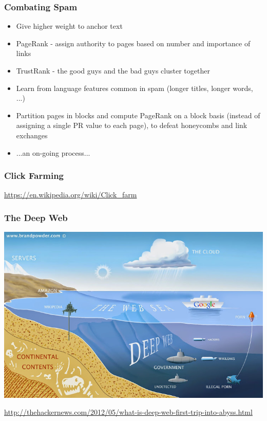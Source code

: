 \documentclass{beamer}
\begin{document}
\begin{frame}   \frametitle{Combating Spam}

\begin{itemize}
\item Give higher weight to anchor text
\item PageRank - assign authority to pages based on number and importance of links
\item TrustRank - the good guys and the bad guys cluster together
\item Learn from language features common in spam (longer titles,
  longer words, ...)
\item Partition pages in blocks and compute PageRank on a block basis
  (instead of assigning a single PR value to each page), to defeat
  honeycombs and link exchanges
\item ...an on-going process... 

\end{itemize}
\end{frame}



\begin{frame} \frametitle{Click Farming}

\href{https://en.wikipedia.org/wiki/Click_farm}{\url{https://en.wikipedia.org/wiki/Click_farm}}  

\end{frame}


\begin{frame} \frametitle{The Deep Web}


\includegraphics[width=1.0\textwidth]{deep-web.jpg} 


\small{
\href{http://thehackernews.com/2012/05/what-is-deep-web-first-trip-into-abyss.html}
        {\url{http://thehackernews.com/2012/05/what-is-deep-web-first-trip-into-abyss.html}}  
}

\end{frame}


\end{document}
